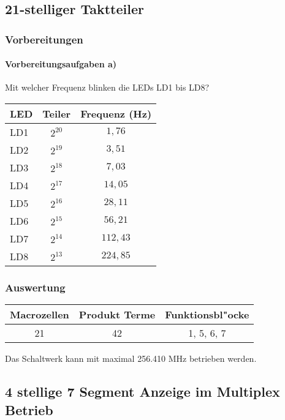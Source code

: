 \documentclass [] {scrartcl}
\begin{document}
  \subsection{21-stelliger Taktteiler}
  \subsubsection{Vorbereitungen}
  \paragraph{Vorbereitungsaufgaben a)}
  Mit welcher Frequenz blinken die LEDs LD1 bis LD8?

 \begin{table}[h]
  \begin{tabular}{l|c|c}
    LED & Teiler & Frequenz (Hz) \\
    \hline
    LD1 & $2^{20}$ & $1,76$ \\
    LD2 & $2^{19}$ & $3,51$ \\
    LD3 & $2^{18}$ & $7,03$ \\
    LD4 & $2^{17}$ & $14,05$ \\
    LD5 & $2^{16}$ & $28,11$ \\
    LD6 & $2^{15}$ & $56,21$ \\
    LD7 & $2^{14}$ & $112,43$ \\
    LD8 & $2^{13}$ & $224,85$ \\
  \end{tabular}
 \end{table}

  \subsubsection{Auswertung}

  \begin{table}[h]
    \begin{tabular}{c|c|c}
      Macrozellen & Produkt Terme & Funktionsbl"ocke\\
      \hline
      21 & 42 & 1, 5, 6, 7\\
    \end{tabular}
  \end{table}

  Das Schaltwerk kann mit maximal 256.410 MHz betrieben werden.

  \subsection{4 stellige 7 Segment Anzeige im Multiplex Betrieb}
\end{document}
